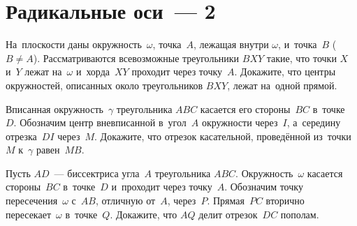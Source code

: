 
\section*{Радикальные оси~--- 2}


\begin{problems}


\item
На~плоскости даны окружность~$\omega$, точка~$A$, лежащая внутри $\omega$,
и~точка~$B$ ($B \neq A$).
Рассматриваются всевозможные треугольники $BXY$ такие, что точки $X$ и~$Y$
лежат на~$\omega$ и~хорда~$XY$ проходит через точку~$A$.
Докажите, что центры окружностей, описанных около треугольников $BXY$, лежат
на~одной прямой.

\item
Вписанная окружность~$\gamma$ треугольника $ABC$ касается его стороны~$BC$
в~точке~$D$.
Обозначим центр вневписанной в~угол~$A$ окружности через~$I$, а~середину
отрезка~$DI$ через~$M$.
Докажите, что отрезок касательной, проведённой из~точки~$M$ к~$\gamma$
равен~$MB$.

\item
Пусть $AD$~--- биссектриса угла~$A$ треугольника $ABC$.
Окружность~$\omega$ касается стороны~$BC$ в~точке~$D$ и~проходит через
точку~$A$.
Обозначим точку пересечения~$\omega$ с~$AB$, отличную от~$A$, через~$P$.
Прямая~$PC$ вторично пересекает~$\omega$ в~точке~$Q$.
Докажите, что $AQ$ делит отрезок~$DC$ пополам.



\end{problems}
